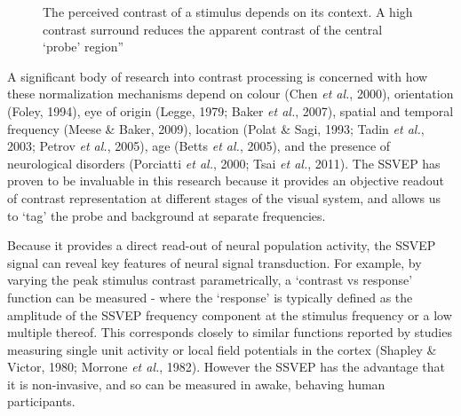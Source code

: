 \documentclass[
  letterpaper,
  DIV=11,
  numbers=noendperiod]{scrartcl}
\begin{document}
\begin{figure}


\caption{\label{fig-centresurround}The perceived contrast of a stimulus
depends on its context. A high contrast surround reduces the apparent
contrast of the central `probe' region''}

\end{figure}%

A significant body of research into contrast processing is concerned
with how these normalization mechanisms depend on colour (Chen \emph{et
al.}, 2000), orientation (Foley, 1994), eye of origin (Legge, 1979;
Baker \emph{et al.}, 2007), spatial and temporal frequency (Meese \&
Baker, 2009), location (Polat \& Sagi, 1993; Tadin \emph{et al.}, 2003;
Petrov \emph{et al.}, 2005), age (Betts \emph{et al.}, 2005), and the
presence of neurological disorders (Porciatti \emph{et al.}, 2000; Tsai
\emph{et al.}, 2011). The SSVEP has proven to be invaluable in this
research because it provides an objective readout of contrast
representation at different stages of the visual system, and allows us
to `tag' the probe and background at separate frequencies.

Because it provides a direct read-out of neural population activity, the
SSVEP signal can reveal key features of neural signal transduction. For
example, by varying the peak stimulus contrast parametrically, a
`contrast vs response' function can be measured - where the `response'
is typically defined as the amplitude of the SSVEP frequency component
at the stimulus frequency or a low multiple thereof. This corresponds
closely to similar functions reported by studies measuring single unit
activity or local field potentials in the cortex (Shapley \& Victor,
1980; Morrone \emph{et al.}, 1982). However the SSVEP has the advantage
that it is non-invasive, and so can be measured in awake, behaving human
participants.
\end{document}
